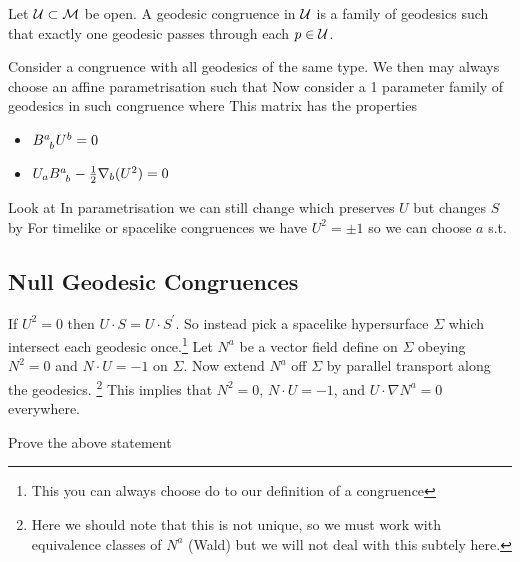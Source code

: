 \documentclass{article}
\begin{document}
\begin{definition}
Let $\mathcal{U} \subset \mathcal{M}$ be open. A geodesic congruence in $\mathcal{U}$ is a family of geodesics such that exactly one geodesic passes through each $p \in \mathcal{U}$. 
\end{definition}

Consider a congruence with all geodesics of the same type. We then may always choose an affine parametrisation such that 
Now consider a 1 parameter family of geodesics in such congruence 
where 
This matrix has the properties 
\begin{itemize}
    \item $B\indices{^a_b} U^b = 0 $
    \item $U_a B\indices{^a_b} - \frac{1}{2} \nabla_b (U^2) = 0$
\end{itemize}

Look at 
In parametrisation we can still change
which preserves $U$ but changes $S$ by 
For timelike or spacelike congruences we have $U^2 = \pm 1$ so we can choose $a$ s.t. 
\subsection{Null Geodesic Congruences} 
If $U^2 = 0$ then $U \cdot S = U \cdot S^\prime$. So instead pick a spacelike hypersurface $\Sigma$ which intersect each geodesic once.\footnote{This you can always choose do to our definition of a congruence} Let $N^a$ be a vector field define on $\Sigma$ obeying $N^2 = 0$ and $N \cdot U = -1$ on $\Sigma$. Now extend $N^a$ off $\Sigma$ by parallel transport along the geodesics. 
\footnote{Here we should note that this is not unique, so we must work with equivalence classes of $N^a$ (Wald) but we will not deal with this subtely here. }
This implies that $N^2 = 0 $, $N \cdot U = -1$, and $U \cdot \nabla N^a = 0$ everywhere. 
\begin{ex}
Prove the above statement
\end{ex}
\end{document}
